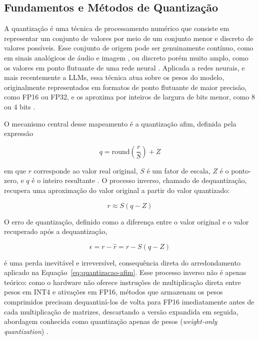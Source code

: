 \subsection{Fundamentos e Métodos de Quantização}
\label{subsec:fundamentos-quantizacao}

A quantização é uma técnica de processamento numérico que consiste em representar um conjunto de valores por meio de um conjunto menor e discreto de valores possíveis. Esse conjunto de origem pode ser genuinamente contínuo, como em sinais analógicos de áudio e imagem \cite{jayant1984digital}, ou discreto porém muito amplo, como os valores em ponto flutuante de uma rede neural \cite{gholami2022survey}. Aplicada a redes neurais, e mais recentemente a LLMs, essa técnica atua sobre os pesos do modelo, originalmente representados em formatos de ponto flutuante de maior precisão, como FP16 ou FP32, e os aproxima por inteiros de largura de bits menor, como 8 ou 4 bits \cite{gholami2022survey}.

O mecanismo central desse mapeamento é a quantização afim, definida pela expressão

\begin{equation}
	q = \mathrm{round}\!\left(\frac{r}{S}\right) + Z
	\label{eq:quantizacao-afim}
\end{equation}

em que $r$ corresponde ao valor real original, $S$ é um fator de escala, $Z$ é o ponto-zero, e $q$ é o inteiro resultante \cite{gholami2022survey}. O processo inverso, chamado de dequantização, recupera uma aproximação do valor original a partir do valor quantizado:

\begin{equation}
	r \approx S(q - Z)
	\label{eq:dequantizacao}
\end{equation}

O erro de quantização, definido como a diferença entre o valor original e o valor recuperado após a dequantização,

\begin{equation}
	\epsilon = r - \hat{r} = r - S(q - Z)
	\label{eq:erro-quantizacao}
\end{equation}

é uma perda inevitável e irreversível, consequência direta do arredondamento aplicado na Equação~\ref{eq:quantizacao-afim}. Esse processo inverso não é apenas teórico: como o hardware não oferece instruções de multiplicação direta entre pesos em INT4 e ativações em FP16, métodos que armazenam os pesos comprimidos precisam dequantizá-los de volta para FP16 imediatamente antes de cada multiplicação de matrizes, descartando a versão expandida em seguida, abordagem conhecida como quantização apenas de pesos (\textit{weight-only quantization}) \cite{lin2024awq, frantar2023gptq}.

